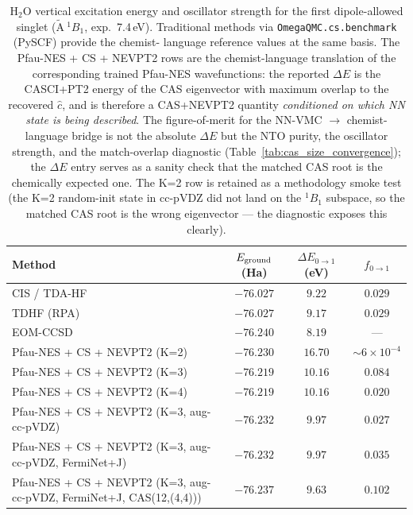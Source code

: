 \documentclass[journal=jctcce,manuscript=suppinfo,layout=traditional]{achemso}
\begin{document}
\begin{table}[h]
\centering
\caption{H$_2$O vertical excitation energy and oscillator
strength for the first dipole-allowed singlet
($\tilde{\mathrm{A}}\ ^1B_1$, exp.\ 7.4\,eV). Traditional methods
via \texttt{OmegaQMC.cs.benchmark} (PySCF) provide the chemist-
language reference values at the same basis. The Pfau-NES + CS +
NEVPT2 rows are the chemist-language translation of the
corresponding trained Pfau-NES wavefunctions: the reported
$\Delta E$ is the CASCI+PT2 energy of the CAS eigenvector with
maximum overlap to the recovered $\widehat c$, and is therefore a
CAS+NEVPT2 quantity \emph{conditioned on which NN state is being
described}. The figure-of-merit for the NN-VMC $\to$
chemist-language bridge is not the absolute $\Delta E$ but the
NTO purity, the oscillator strength, and the match-overlap
diagnostic (Table~\ref{tab:cas_size_convergence}); the
$\Delta E$ entry serves as a sanity check that the matched CAS
root is the chemically expected one. The K=2 row is retained as a
methodology smoke test (the K=2 random-init state in cc-pVDZ did
not land on the $^1B_1$ subspace, so the matched CAS root is the
wrong eigenvector --- the diagnostic exposes this clearly).}
\label{tab:h2o_ccpvdz_comparison}
\small
\begin{tabular}{lccc}
\hline
Method & $E_{\rm ground}$ (Ha) & $\Delta E_{0\to 1}$ (eV) & $f_{0\to 1}$ \\
\hline
CIS / TDA-HF                   & $-76.027$ & $9.22$ & $0.029$ \\
TDHF (RPA)                     & $-76.027$ & $9.17$ & $0.029$ \\
EOM-CCSD                       & $-76.240$ & $\mathbf{8.19}$ & --- \\
Pfau-NES + CS + NEVPT2 (K=2)   & $-76.230$ & $16.70$ & $\sim 6\!\times\!10^{-4}$ \\
Pfau-NES + CS + NEVPT2 (K=3)   & $-76.219$ & $\mathbf{10.16}$ & $\mathbf{0.084}$ \\
Pfau-NES + CS + NEVPT2 (K=4)   & $-76.219$ & $10.16$ & $0.020$ \\
Pfau-NES + CS + NEVPT2 (K=3, aug-cc-pVDZ) & $-76.232$ & $\mathbf{9.97}$ & $0.027$ \\
Pfau-NES + CS + NEVPT2 (K=3, aug-cc-pVDZ, FermiNet+J)
                                & $-76.232$ & $\mathbf{9.97}$ & $0.035$ \\
Pfau-NES + CS + NEVPT2 (K=3, aug-cc-pVDZ, FermiNet+J, CAS(12,(4,4)))
                                & $-76.237$ & $\mathbf{9.63}$ & $0.102$ \\

\end{tabular}
\end{table}
\end{document}
